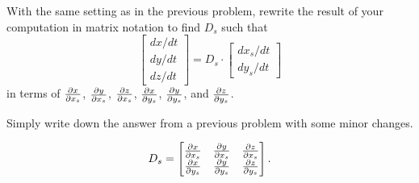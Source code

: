 \documentclass[newpage,hints,handout]{ximera}
\begin{document}
\begin{problem}
  With the same setting as in the previous problem, rewrite the result
  of your computation in matrix notation to find $D_s$ such that
  \[
  \begin{bmatrix}
    dx/dt \\ dy/dt \\ dz/dt
  \end{bmatrix}
  =D_s \cdot
  \begin{bmatrix}
    dx_s/dt \\ dy_s/dt
  \end{bmatrix}
  \]
in terms of $\pp[x]{x_s}$, $\pp[y]{x_s}$, $\pp[z]{x_s}$,
$\pp[x]{y_s}$, $\pp[y]{y_s}$, and $\pp[z]{y_s}$.
\begin{hint}
  Simply write down the answer from a previous problem with some minor changes.
\end{hint}
\begin{freeResponse}
  \[
  D_s =
  \begin{bmatrix}
    \pp[x]{x_s} & \pp[y]{x_s} & \pp[z]{x_s} \\
    \pp[x]{y_s}   & \pp[y]{y_s}   & \pp[z]{y_s}
  \end{bmatrix}.
  \]
\end{freeResponse}
\end{problem}
\end{document}

